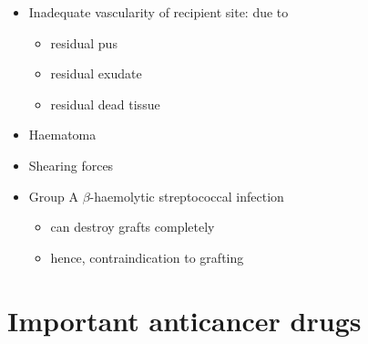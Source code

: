 \documentclass[
  14pt,
]{extarticle}
\providecommand{\tightlist}{%
  \setlength{\itemsep}{0pt}\setlength{\parskip}{0pt}}
\begin{document}
\begin{itemize}
\tightlist
\item
  Inadequate vascularity of recipient site: due to

  \begin{itemize}
  \tightlist
  \item
    residual pus
  \item
    residual exudate
  \item
    residual dead tissue
  \end{itemize}
\item
  Haematoma
\item
  Shearing forces
\item
  Group A \(\beta\)-haemolytic streptococcal infection

  \begin{itemize}
  \tightlist
  \item
    can destroy grafts completely
  \item
    hence, contraindication to grafting
  \end{itemize}
\end{itemize}

\pagebreak

\hypertarget{important-anticancer-drugs}{%
\section{Important anticancer drugs}\label{important-anticancer-drugs}}
\end{document}
